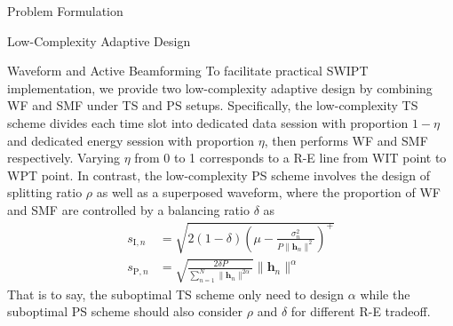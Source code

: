 \documentclass[journal]{IEEEtran}
\begin{document}
\begin{section}{Problem Formulation}
\begin{subsection}{Low-Complexity Adaptive Design}
\begin{subsubsection}{Waveform and Active Beamforming}
				To facilitate practical SWIPT implementation, we provide two low-complexity adaptive design by combining WF and SMF under TS and PS setups.	Specifically, the low-complexity TS scheme divides each time slot into dedicated data session with proportion $1 - \eta$ and dedicated energy session with proportion $\eta$, then performs WF and SMF respectively. Varying $\eta$ from \num{0} to \num{1} corresponds to a R-E line from WIT point to WPT point. In contrast, the low-complexity PS scheme involves the design of splitting ratio $\rho$ as well as a superposed waveform, where the proportion of WF and SMF are controlled by a balancing ratio $\delta$ as
				\begin{align}
					s_{\mathrm{I}, n} &= \sqrt{2(1 - \delta)\left(\mu - \frac{\sigma_n^2}{P \lVert{\boldsymbol{h}_n}\rVert^2}\right)^+} \\
					s_{\mathrm{P}, n} &= \sqrt{\frac{2 \delta P}{\sum_{n=1}^N \lVert{\boldsymbol{h}_n \rVert^{2 \alpha}}}}\lVert{\boldsymbol{h}_n}\rVert^\alpha
				\end{align}
				That is to say, the suboptimal TS scheme only need to design $\alpha$ while the suboptimal PS scheme should also consider $\rho$ and $\delta$ for different R-E tradeoff.
			\end{subsubsection}
		\end{subsection}
	\end{section}
\end{document}

